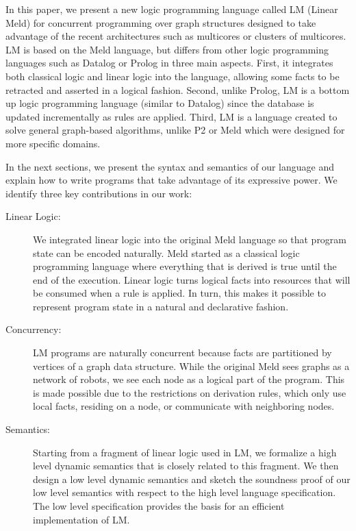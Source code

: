 In this paper, we present a new logic programming language called LM (Linear Meld) for concurrent programming over graph structures designed to take advantage
of the recent architectures such as multicores or clusters of multicores. LM is based on the Meld language, but differs from other logic programming languages
such as Datalog or Prolog in three main aspects. First, it integrates both classical
logic and linear logic into the language, allowing some facts to be retracted and asserted in a logical fashion. Second, unlike
Prolog, LM is a bottom up logic programming language (similar to Datalog) since the database is updated incrementally as rules are
applied. Third, LM is a language created to solve general graph-based algorithms, unlike P2 or Meld which were designed for more specific domains.

In the next sections, we present the syntax and semantics of our language and explain how to write programs that take advantage of its expressive power. We identify three key contributions in our work:

\begin{description}
   \item[Linear Logic:] We integrated linear logic into the original Meld language so that program state can be encoded naturally.
   Meld started as a classical logic programming language where everything that is derived is true until the end
   of the execution. Linear logic turns logical facts into resources that will be consumed when a rule is applied. In turn, this makes it possible to represent program state in a natural and declarative fashion.
   \item[Concurrency:] LM programs are naturally concurrent because facts are partitioned by vertices of a graph data structure. While the original Meld sees graphs as a network of robots, we see each node as a logical part of the program. This is made possible due to the restrictions on derivation rules, which
only use local facts, residing on a node, or communicate with neighboring nodes.
   \item[Semantics:] Starting from a fragment of linear logic used in LM, we formalize a high level dynamic semantics that is closely related to this fragment.
   We then design a low level dynamic semantics and sketch the soundness proof of our low level
   semantics with respect to the high level language specification. The low level specification
   provides the basis for an efficient implementation of LM.
\end{description}

